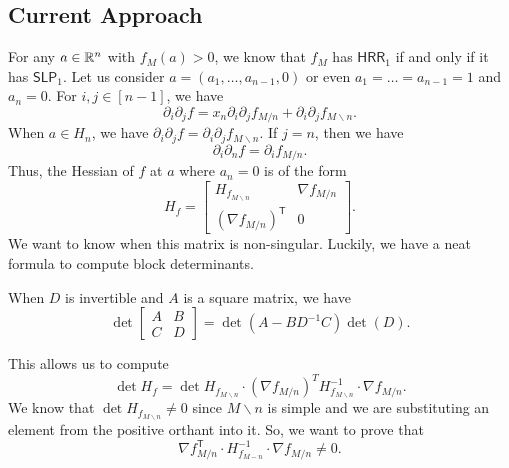 \documentclass[12pt]{article}
\newcommand{\SLP}{\mathsf{SLP}}
\newcommand{\HRR}{\mathsf{HRR}}
\begin{document}
\subsection{Current Approach}

For any $a \in \mathbb{R}^n$ with $f_M(a) > 0$, we know that $f_M$ has $\HRR_1$ if and only if it has $\SLP_1$. Let us consider $a = (a_1, \ldots, a_{n-1}, 0)$ or even $a_1 = \ldots = a_{n-1} = 1$ and $a_n = 0$. For $i, j \in [n-1]$, we have 
\[
	\partial_i \partial_j f = x_n \partial_i \partial_j f_{M / n} + \partial_{i} \partial_j f_{M \backslash n}.
\]
When $a \in H_n$, we have $\partial_i \partial_j f = \partial_i \partial_j f_{M \backslash n}$.  If $j = n$, then we have 
\[
	\partial_i \partial_n f = \partial_i f_{M / n}.
\]
Thus, the Hessian of $f$ at $a$ where $a_n = 0$ is of the form 
\[
	H_f = \begin{bmatrix}
		H_{f_{M \backslash n}} & \nabla f_{M/n} \\
		\left ( \nabla f_{M/n} \right )^{\mathsf{T}} & 0
	\end{bmatrix}.
\]
We want to know when this matrix is non-singular. Luckily, we have a neat formula to compute block determinants. 

\begin{thm} 
	When $D$ is invertible and $A$ is a square matrix, we have
	\[
		\det \begin{bmatrix}
			A & B \\ C & D
		\end{bmatrix} = \det (A - BD^{-1}C) \det (D).
	\]
\end{thm}

This allows us to compute
\[
	\det H_f = \det H_{f_{M \backslash n}} \cdot (\nabla f_{M / n})^T H_{f_{M\backslash n}}^{-1} \cdot \nabla f_{M/n}. 
\]
We know that $\det H_{f_{M\backslash n}} \neq 0$ since $M \backslash n$ is simple and we are substituting an element from the positive orthant into it. So, we want to prove that 
\[
 	\nabla f_{M/n}^\mathsf{T} \cdot H_{f_{M - n}}^{-1} \cdot \nabla f_{M/n} \neq 0.
\]



\end{document}
